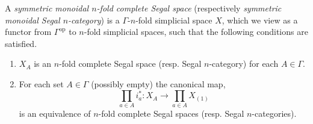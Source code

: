 \documentclass[a4paper]{amsart}
\begin{document}
\begin{definition}
	A {\em symmetric monoidal $n$-fold complete Segal space} (respectively {\em symmetric monoidal Segal $n$-category}) is a $\Gamma$-$n$-fold simplicial space $X$, which we view as a functor from $\Gamma^\textrm{op}$ to $n$-fold simplicial spaces, such that the following conditions are satisfied. 
	\begin{enumerate}
		\item $X_A$ is an $n$-fold complete Segal space (resp. Segal $n$-category) for each $A \in \Gamma$. 
		\item For each set $A \in \Gamma$ (possibly empty) the canonical map,
		\begin{equation*}
			\prod_{a \in A} i_a^*: X_A \to \prod_{a \in A} X_{(1)}
		\end{equation*}
		is an equivalence of $n$-fold complete Segal spaces (resp. Segal $n$-categories). 
	\end{enumerate}
\end{definition}

\end{document}
